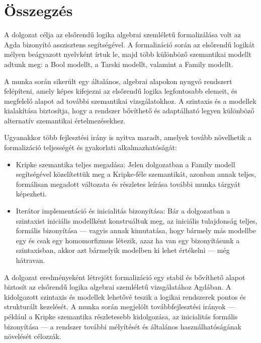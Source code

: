 \chapter{Összegzés}
\label{ch:summary}

A dolgozat célja az elsőrendű logika algebrai szemléletű formalizálása volt az Agda bizonyító asszisztens segítségével. A formalizáció során az elsőrendű logikát mélyen beágyazott nyelvként írtuk le, majd több különböző szemantikai modellt adtunk meg: a Bool modellt, a Tarski modellt, valamint a Family modellt.

A munka során sikerült egy általános, algebrai alapokon nyugvó rendszert felépíteni, amely képes kifejezni az elsőrendű logika legfontosabb elemeit, és megfelelő alapot ad további szemantikai vizsgálatokhoz. A szintaxis és a modellek kialakítása biztosítja, hogy a rendszer bővíthető és adaptálható legyen különböző alternatív szemantikai értelmezésekhez.

Ugyanakkor több fejlesztési irány is nyitva maradt, amelyek tovább növelhetik a formalizáció teljességét és gyakorlati alkalmazhatóságát:

\begin{itemize}
\item Kripke szemantika teljes megadása: Jelen dolgozatban a Family modell segítségével közelítettük meg a Kripke-féle szemantikát, azonban annak teljes, formálisan megadott változata és részletes leírása további munka tárgyát képezheti.
\item Iterátor implementáció és inicialitás bizonyítása: Bár a dolgozatban a szintaxist iniciális modellként konstruáltuk meg, az iniciális tulajdonság teljes, formális bizonyítása — vagyis annak kimutatása, hogy bármely más modellbe egy és csak egy homomorfizmus létezik, azaz ha van egy bizonyításunk a szintaxisban, akkor azt bármelyik modelben ki lehet értékelni — még hátravan.
\end{itemize}

A dolgozat eredményeként létrejött formalizáció egy stabil és bővíthető alapot biztosít az elsőrendű logika algebrai szemléletű vizsgálatához Agdában. A kidolgozott szintaxis és modellek lehetővé teszik a logikai rendszerek pontos és strukturált kezelését. A munka során megjelölt továbbfejlesztési irányok — például a Kripke szemantika részletesebb kidolgozása, az inicialitás formális bizonyítása — a rendszer további mélyítését és általános használhatóságának növelését célozzák.